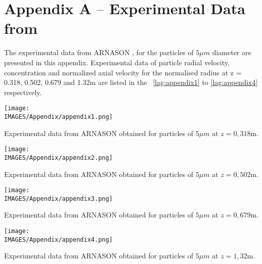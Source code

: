 \appendix
\section{Appendix A $–$ Experimental Data from \cite{Arnason}}\label{lag:appendixA}

The experimental data from ARNASON \cite{Arnason}, for the particles of $5\mu m$ diameter are presented in this appendix.  Experimental data of particle radial velocity, concentration and normalized axial velocity for the normalised radius at z = 0.318, 0.502, 0.679 and 1.32m are listed in the \tablename~\ref{lag:appendix1} to \ref{lag:appendix4} respectively.

\begin{table}[H]
\centering
\texttt{[image: \\IMAGES/Appendix/appendix1.png]}
\caption{Experimental data from ARNASON obtained for particles of $5\mu m$ \cite{Arnason} at $z=0,318$m.}\label{lag:appendix1}
\end{table}


\begin{table}[H]
\centering
\texttt{[image: \\IMAGES/Appendix/appendix2.png]}
\caption{Experimental data from ARNASON obtained for particles of $5\mu m$ \cite{Arnason} at $z=0,502$m.}\label{lag:appendix2}
\end{table}


\begin{table}[H]
\centering
\texttt{[image: \\IMAGES/Appendix/appendix3.png]}
\caption{Experimental data from ARNASON obtained for particles of $5\mu m$ \cite{Arnason} at $z=0,679$m.}\label{lag:appendix3}
\end{table}


\begin{table}[H]
\centering
\texttt{[image: \\IMAGES/Appendix/appendix4.png]}
\caption{Experimental data from ARNASON obtained for particles of $5\mu m$ \cite{Arnason} at $z=1,32$m.}\label{lag:appendix4}
\end{table}






